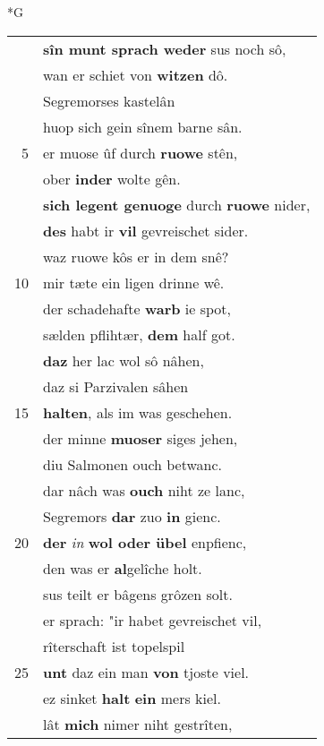 \documentclass[8pt,a4paper,notitlepage]{article}
\begin{document}
\newpage
\begin{table}[ht]
\begin{minipage}[t]{0.5\linewidth}
\small
\begin{center}*G
\end{center}
\begin{tabular}{rl}
 & \textbf{sîn munt sprach weder} sus noch sô,\\ 
 & wan er schiet von \textbf{witzen} dô.\\ 
 & Segremorses kastelân\\ 
 & huop sich gein sînem barne sân.\\ 
5 & er muose ûf durch \textbf{ruowe} stên,\\ 
 & ober \textbf{inder} wolte gên.\\ 
 & \textbf{sich legent genuoge} durch \textbf{ruowe} nider,\\ 
 & \textbf{des} habt ir \textbf{vil} gevreischet sider.\\ 
 & waz ruowe kôs er in dem snê?\\ 
10 & mir tæte ein ligen drinne wê.\\ 
 & der schadehafte \textbf{warb} ie spot,\\ 
 & sælden pflihtær, \textbf{dem} half got.\\ 
 & \textbf{daz} her lac wol sô nâhen,\\ 
 & daz si Parzivalen sâhen\\ 
15 & \textbf{halten}, als im was geschehen.\\ 
 & der minne \textbf{muoser} siges jehen,\\ 
 & diu Salmonen ouch betwanc.\\ 
 & dar nâch was \textbf{ouch} niht ze lanc,\\ 
 & Segremors \textbf{dar} zuo \textbf{in} gienc.\\ 
20 & \textbf{der} \textit{in} \textbf{wol oder übel} enpfienc,\\ 
 & den was er \textbf{al}gelîche holt.\\ 
 & sus teilt er bâgens grôzen solt.\\ 
 & er sprach: "ir habet gevreischet vil,\\ 
 & rîterschaft ist topelspil\\ 
25 & \textbf{unt} daz ein man \textbf{von} tjoste viel.\\ 
 & ez sinket \textbf{halt} \textbf{ein} mers kiel.\\ 
 & lât \textbf{mich} nimer niht gestrîten,\\ 

\end{tabular}
\end{minipage}
\end{table}
\end{document}
